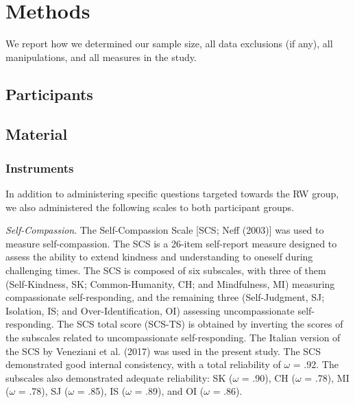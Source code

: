 \documentclass[
  man]{apa7}
\begin{document}
\hypertarget{methods}{%
\section{Methods}\label{methods}}

We report how we determined our sample size, all data exclusions (if any), all manipulations, and all measures in the study.

\hypertarget{participants}{%
\subsection{Participants}\label{participants}}

\hypertarget{material}{%
\subsection{Material}\label{material}}

\hypertarget{instruments}{%
\subsubsection{Instruments}\label{instruments}}

In addition to administering specific questions targeted towards the RW group, we also administered the following scales to both participant groups.

\emph{Self-Compassion}. The Self-Compassion Scale {[}SCS; Neff (2003){]} was used to measure self-compassion. The SCS is a 26-item self-report measure designed to assess the ability to extend kindness and understanding to oneself during challenging times. The SCS is composed of six subscales, with three of them (Self-Kindness, SK; Common-Humanity, CH; and Mindfulness, MI) measuring compassionate self-responding, and the remaining three (Self-Judgment, SJ; Isolation, IS; and Over-Identification, OI) assessing uncompassionate self-responding. The SCS total score (SCS-TS) is obtained by inverting the scores of the subscales related to uncompassionate self-responding. The Italian version of the SCS by Veneziani et al. (2017) was used in the present study. The SCS demonstrated good internal consistency, with a total reliability of \(\omega\) = .92. The subscales also demonstrated adequate reliability: SK (\(\omega\) = .90), CH (\(\omega\) = .78), MI (\(\omega\) = .78), SJ (\(\omega\) = .85), IS (\(\omega\) = .89), and OI (\(\omega\) = .86).
\end{document}
